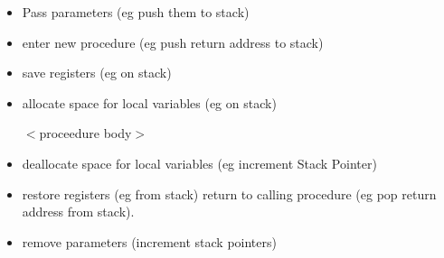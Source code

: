 \documentclass[a4paper,12pt]{article}
\begin{document}
\begin{itemize}

\item Pass parameters (eg push them to stack)

\item enter new procedure (eg push return address to stack)

\item save registers (eg on stack)

\item allocate space for local variables (eg on stack)

\subitem $<$proceedure body$>$

\item deallocate space for local variables (eg increment Stack Pointer)

\item restore registers (eg from stack)
return to calling procedure (eg pop return address from stack).

\item remove parameters (increment stack pointers)
\end{itemize}
\end{document}
